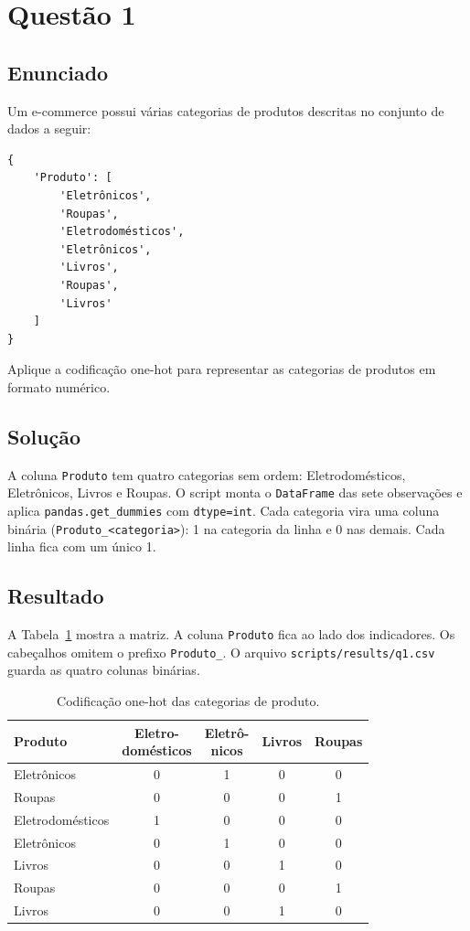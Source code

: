 \section{Questão 1}

\subsection{Enunciado}

Um e-commerce possui várias categorias de produtos descritas no conjunto de dados a seguir:
\begin{verbatim}
{
    'Produto': [
        'Eletrônicos',
        'Roupas',
        'Eletrodomésticos',
        'Eletrônicos',
        'Livros',
        'Roupas',
        'Livros'
    ]
}
\end{verbatim}
Aplique a codificação one-hot para representar as categorias de produtos em formato numérico.

\subsection{Solução}

A coluna \texttt{Produto} tem quatro categorias sem ordem: Eletrodomésticos, Eletrônicos, Livros e Roupas. O script monta o \texttt{DataFrame} das sete observações e aplica \texttt{pandas.get\_dummies} com \texttt{dtype=int}. Cada categoria vira uma coluna binária (\texttt{Produto\_<categoria>}): 1 na categoria da linha e 0 nas demais. Cada linha fica com um único 1.

\subsection{Resultado}

A Tabela~\ref{tab:q1-onehot} mostra a matriz. A coluna \texttt{Produto} fica ao lado dos indicadores. Os cabeçalhos omitem o prefixo \texttt{Produto\_}. O arquivo \texttt{scripts/results/q1.csv} guarda as quatro colunas binárias.

\begin{table}[H]
    \centering
    \caption{Codificação one-hot das categorias de produto.}
    \label{tab:q1-onehot}
    \footnotesize
    \setlength{\tabcolsep}{4pt}
    \begin{tabular}{@{}lcccc@{}}
        \toprule
        Produto &
        \shortstack{Eletro-\\domésticos} &
        \shortstack{Eletrô-\\nicos} &
        Livros &
        Roupas \\
        \midrule
        Eletrônicos      & 0 & 1 & 0 & 0 \\
        Roupas           & 0 & 0 & 0 & 1 \\
        Eletrodomésticos & 1 & 0 & 0 & 0 \\
        Eletrônicos      & 0 & 1 & 0 & 0 \\
        Livros           & 0 & 0 & 1 & 0 \\
        Roupas           & 0 & 0 & 0 & 1 \\
        Livros           & 0 & 0 & 1 & 0 \\
        \bottomrule
    \end{tabular}
\end{table}
